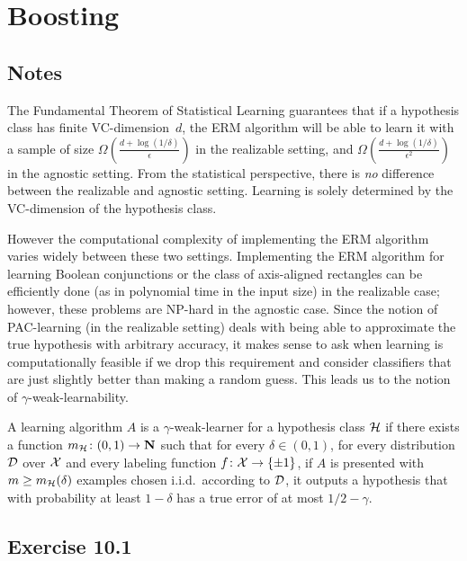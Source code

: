\chapter{Boosting}

\section{Notes}

The Fundamental Theorem of Statistical Learning guarantees that if a hypothesis
class has finite VC-dimension~$d$, the ERM algorithm will be able to
learn it with a sample of size $\Omega(\frac{d + \log (1 / \delta)}{\epsilon})$
in the realizable setting, and $\Omega(\frac{d + \log (1 /
\delta)}{\epsilon^2})$ in the agnostic setting. From the statistical
perspective, there is \emph{no} difference between the realizable and agnostic
setting. Learning is solely determined by the VC-dimension of the hypothesis
class.

However the computational complexity of implementing the ERM algorithm varies
widely between these two settings. Implementing the ERM algorithm for learning
Boolean conjunctions or the class of axis-aligned rectangles can be efficiently
done (as in polynomial time in the input size) in the realizable case; however,
these problems are NP-hard in the agnostic case. Since the notion of
PAC-learning (in the realizable setting) deals with being able to approximate
the true hypothesis with arbitrary accuracy, it makes sense to ask when
learning is computationally feasible if we drop this requirement and consider
classifiers that are just slightly better than making a random guess.  This
leads us to the notion of $\gamma$-weak-learnability.

\begin{definition}
A learning algorithm $A$ is a $\gamma$-weak-learner for a hypothesis class 
$\mathcal{H}$ if there exists a function $m_{\mathcal{H}} \colon (0, 1) \rightarrow \mathbf{N}$
such that for every $\delta \in (0, 1)$, for every distribution $\mathcal{D}$ over $\mathcal{X}$
and every labeling function $f \colon \mathcal{X} \rightarrow \{\pm 1\}$, if $A$ 
is presented with $m \geq m_{\mathcal{H}} (\delta)$ examples chosen i.i.d.\ 
according to $\mathcal{D}$, it outputs a hypothesis that with probability at least 
$1 - \delta$ has a true error of at most $1/2 - \gamma$. 
\end{definition}

\section*{Exercise 10.1}

